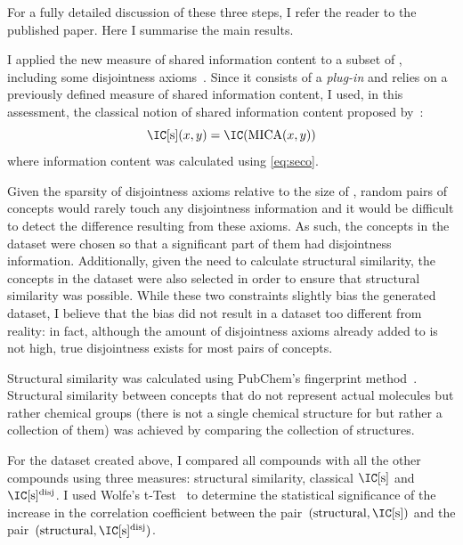For a fully detailed discussion of these three steps, I refer the reader to the published paper. Here I summarise the main results.

 I applied the new measure of shared information content to a subset of , including some disjointness axioms~\citep{Hastings2012,Hastings2013}. Since it consists of a \emph{plug-in} and relies on a previously defined measure of shared information content, I used, in this assessment, the classical notion of shared information content proposed by~\citet{Resnik1995}:
\begin{equation}
    \ICs(x,y) = \IC(\MICA(x,y))
\end{equation}
where information content was calculated using \eqref{eq:seco}.

Given the sparsity of disjointness axioms relative to the size of , random pairs of concepts would rarely touch any disjointness information and it would be difficult to detect the difference resulting from these axioms. As such, the concepts in the dataset were chosen so that a significant part of them had disjointness information. Additionally, given the need to calculate structural similarity, the concepts in the dataset were also selected in order to ensure that structural similarity was possible. While these two constraints slightly bias the generated dataset, I believe that the bias did not result in a dataset too different from reality: in fact, although the amount of disjointness axioms already added to  is not high, true disjointness exists for most pairs of concepts.

Structural similarity was calculated using PubChem's fingerprint method~\citep{Bolton2008}. Structural similarity between  concepts that do not represent actual molecules but rather chemical groups (\eg there is not a single chemical structure for  but rather a collection of them) was achieved by comparing the collection of structures.

For the dataset created above, I compared all compounds with all
the other compounds using three measures: structural similarity, classical $\ICs$ and~$\ICsdis$. I used Wolfe's t-Test~\citep{Wolfe1976,Rosner2010} to determine the statistical significance of the increase in the correlation coefficient between the pair~$(\textrm{structural}, \ICs)$ and the pair~$(\textrm{structural}, \ICsdis)$.

